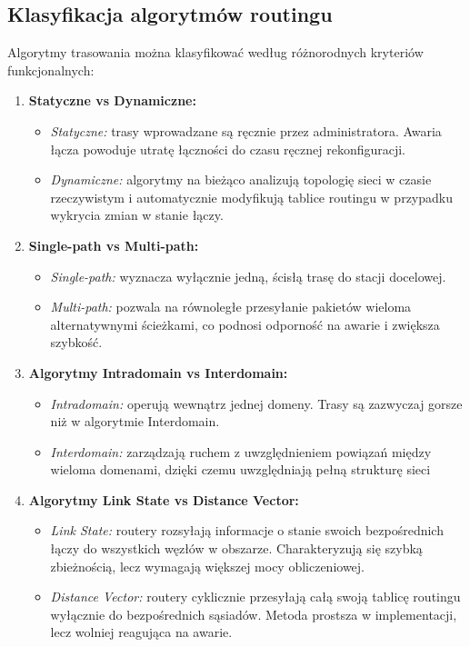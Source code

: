 \documentclass[12pt, a4paper]{article}
\begin{document}
\subsection{Klasyfikacja algorytmów routingu}
Algorytmy trasowania można klasyfikować według różnorodnych kryteriów funkcjonalnych:
\begin{enumerate}
    \item \textbf{Statyczne vs Dynamiczne:}
    \begin{itemize}
        \item \textit{Statyczne:} trasy wprowadzane są ręcznie przez administratora. Awaria łącza powoduje utratę łączności do czasu ręcznej rekonfiguracji.
        \item \textit{Dynamiczne:} algorytmy na bieżąco analizują topologię sieci w czasie rzeczywistym i automatycznie modyfikują tablice routingu w przypadku wykrycia zmian w stanie łączy.
    \end{itemize}
    \item \textbf{Single-path vs Multi-path:}
    \begin{itemize}
        \item \textit{Single-path:} wyznacza wyłącznie jedną, ścisłą trasę do stacji docelowej.
        \item \textit{Multi-path:} pozwala na równoległe przesyłanie pakietów wieloma alternatywnymi ścieżkami, co podnosi odporność na awarie i zwiększa szybkość.
    \end{itemize}
    \item \textbf{Algorytmy Intradomain vs Interdomain:}
    \begin{itemize}
        \item \textit{Intradomain:} operują wewnątrz jednej domeny. Trasy są zazwyczaj gorsze niż w algorytmie Interdomain. 
        \item \textit{Interdomain:} zarządzają ruchem z uwzględnieniem powiązań między wieloma domenami, dzięki czemu uwzględniają pełną strukturę sieci
    \end{itemize}
    \item \textbf{Algorytmy Link State vs Distance Vector:}
    \begin{itemize}
        \item \textit{Link State:} routery rozsyłają informacje o stanie swoich bezpośrednich łączy do wszystkich węzłów w obszarze. Charakteryzują się szybką zbieżnością, lecz wymagają większej mocy obliczeniowej.
        \item \textit{Distance Vector:} routery cyklicznie przesyłają całą swoją tablicę routingu wyłącznie do bezpośrednich sąsiadów. Metoda prostsza w implementacji, lecz wolniej reagująca na awarie.
    \end{itemize}
\end{enumerate}
\end{document}
